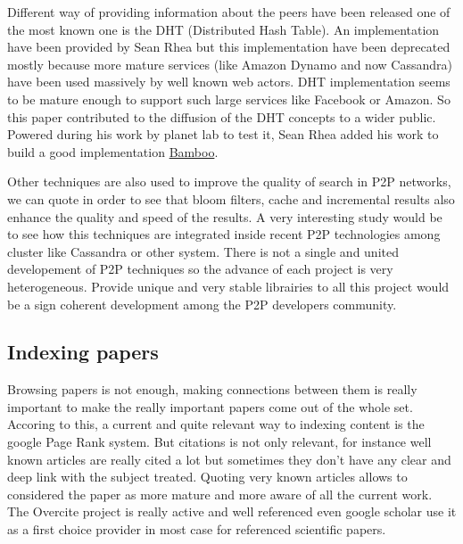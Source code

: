 Different way of providing information about the peers have been released one of the most known one is
the DHT (Distributed Hash Table). An implementation have been provided by Sean Rhea \cite{Rhea:2005:OPD:1090191.1080102}
but this implementation have been deprecated mostly because more mature services (like Amazon Dynamo and now Cassandra)
have been used massively by well known web actors. DHT implementation seems to be mature enough to support such large
services like Facebook or Amazon. So this paper contributed to the diffusion of the DHT concepts to a wider public.
Powered during his work by planet lab to test it, Sean Rhea added 
his work to build a good implementation \href{bamboo-dht.org}{Bamboo}.

Other techniques are also used to improve the quality of search in P2P networks, we can quote
\cite{Reynolds_efficientpeer-to-peer} in order to see that bloom filters, cache and incremental
results also enhance the quality and speed of the results. A very interesting study would be to
see how this techniques are integrated inside recent P2P technologies among cluster like Cassandra
or other system. There is not a single and united developement of P2P techniques so the advance of 
each project is very heterogeneous. Provide unique and very stable librairies to all this project would
be a sign coherent development among the P2P developers community.

\subsection{Indexing papers}

Browsing papers is not enough, making connections between them is really important to make the really 
important papers come out of the whole set. Accoring to this, a current and quite relevant way to
indexing content is the google Page Rank system. But citations is not only relevant, for instance 
well known articles are really cited a lot but sometimes they don't have any clear and deep link 
with the subject treated. Quoting very known articles allows to considered the paper as more mature
and more aware of all the current work. The Overcite project is really \cite{Lawrence99digitallibraries}
active and well referenced even google scholar use it as a first choice provider in most case 
for referenced scientific papers.
